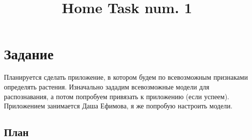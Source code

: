 \documentclass[11pt]{article}
\title{Home Task num. 1}
\begin{document}
    
    
    \maketitle
    
    

    
    \section{Задание}\label{ux437ux430ux434ux430ux43dux438ux435}

    Планируется сделать приложение, в котором будем по всевозможным
признаками определять растения. Изначально зададим всевозможные модели
для распознавания, а потом попробуем привязать к приложению (если
успеем). Приложением занимается Даша Ефимова, я же попробую настроить
модели.

    \subsection{План}\label{ux43fux43bux430ux43d}
\end{document}
